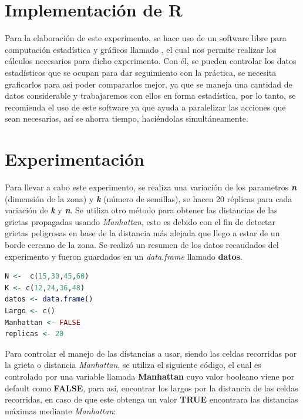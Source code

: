 \documentclass{article}
\begin{document}
\newpage

\section{Implementaci\'on de R}
Para la elaboraci\'on de este experimento, se hace uso de un software libre para computaci\'on estad\'istica y gr\'aficos llamado \citet{R}, el cual nos permite realizar los c\'alculos necesarios para dicho experimento. Con \'el, se pueden controlar los datos estad\'isticos que se ocupan para dar seguimiento con la pr\'actica, se necesita graficarlos para as\'i poder compararlos mejor, ya que se maneja una cantidad de datos considerable y trabajaremos con ellos en forma estad\'istica, por lo tanto, se recomienda el uso de este software ya que ayuda a paralelizar las acciones que sean necesarias, as\'i se ahorra tiempo, haci\'endolas simult\'aneamente.

\section{Experimentaci\'on}

Para llevar a cabo este experimento, se realiza una variaci\'on de los parametros \textbf{\textit{n}} (dimensi\'on de la zona) y \textbf{\textit{k}} (n\'umero de semillas), se hacen 20 r\'eplicas para cada variaci\'on de \textbf{\textit{k}} y \textbf{\textit{n}}. Se utiliza otro m\'etodo para obtener las distancias de las grietas propagadas usando \textit{Manhattan}, esto es debido con el fin de detectar grietas peligrosas en base de la distancia m\'as alejada que llego a estar de un borde cercano de la zona. Se realiz\'o un resumen de los datos recaudados del experimento y fueron guardados en un \textit{data.frame} llamado \textbf{datos}.

\begin{lstlisting}[language=R]
N <-  c(15,30,45,60)
K <- c(12,24,36,48)
datos <- data.frame()
Largo <- c()
Manhattan <- FALSE
replicas <- 20
\end{lstlisting}

Para controlar el manejo de las distancias a usar, siendo las celdas recorridas por la grieta o distancia \textit{Manhattan}, se utiliza el siguiente c\'odigo, el cual es controlado por una variable llamada \textbf{Manhattan} cuyo valor booleano viene por default como \textbf{FALSE}, para as\'i, encontrar los largos por la distancia de las celdas recorridas, en caso de que este obtenga un valor \textbf{TRUE} encontrara las distancias m\'aximas mediante \textit{Manhattan}:
\end{document}
